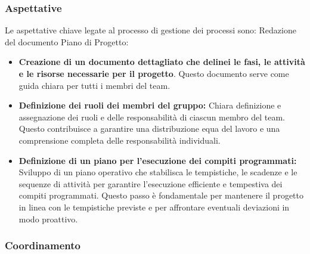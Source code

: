 \documentclass{article}
\begin{document}
\subsubsection{Aspettative}
Le aspettative chiave legate al processo di gestione dei processi sono:
Redazione del documento Piano di Progetto:
\begin{itemize}
    \item \textbf{Creazione di un documento dettagliato che delinei le fasi, le attività e le risorse necessarie per il progetto}. Questo documento serve come guida chiara per tutti i membri del team.
    \item \textbf{Definizione dei ruoli dei membri del gruppo:}
Chiara definizione e assegnazione dei ruoli e delle responsabilità di ciascun membro del team. Questo contribuisce a garantire una distribuzione equa del lavoro e una comprensione completa delle responsabilità individuali.
    \item \textbf{Definizione di un piano per l'esecuzione dei compiti programmati:}
Sviluppo di un piano operativo che stabilisca le tempistiche, le scadenze e le sequenze di attività per garantire l'esecuzione efficiente e tempestiva dei compiti programmati. Questo passo è fondamentale per mantenere il progetto in linea con le tempistiche previste e per affrontare eventuali deviazioni in modo proattivo.
\end{itemize}



\subsubsection{Coordinamento}
\end{document}
